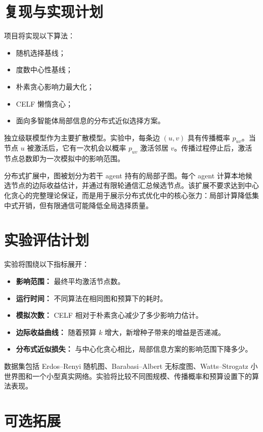 \documentclass[UTF8, 11pt]{ctexart}
\begin{document}
\section{复现与实现计划}

项目将实现以下算法：
\begin{itemize}
    \item 随机选择基线；
    \item 度数中心性基线；
    \item 朴素贪心影响力最大化；
    \item CELF 懒惰贪心；
    \item 面向多智能体局部信息的分布式近似选择方案。
\end{itemize}

独立级联模型作为主要扩散模型。实验中，每条边 $(u,v)$ 具有传播概率 $p_{uv}$。当节点 $u$ 被激活后，它有一次机会以概率 $p_{uv}$ 激活邻居 $v$。传播过程停止后，激活节点总数即为一次模拟中的影响范围。

分布式扩展中，图被划分为若干 agent 持有的局部子图。每个 agent 计算本地候选节点的边际收益估计，并通过有限轮通信汇总候选节点。该扩展不要求达到中心化贪心的完整理论保证，而是用于展示分布式优化中的核心张力：局部计算降低集中式开销，但有限通信可能降低全局选择质量。

\section{实验评估计划}

实验将围绕以下指标展开：
\begin{itemize}
    \item \textbf{影响范围：} 最终平均激活节点数。
    \item \textbf{运行时间：} 不同算法在相同图和预算下的耗时。
    \item \textbf{模拟次数：} CELF 相对于朴素贪心减少了多少影响力估计。
    \item \textbf{边际收益曲线：} 随着预算 $k$ 增大，新增种子带来的增益是否递减。
    \item \textbf{分布式近似损失：} 与中心化贪心相比，局部信息方案的影响范围下降多少。
\end{itemize}

数据集包括 Erdos--Renyi 随机图、Barabasi--Albert 无标度图、Watts--Strogatz 小世界图和一个小型真实网络。实验将比较不同图规模、传播概率和预算设置下的算法表现。

\section{可选拓展}
\end{document}
